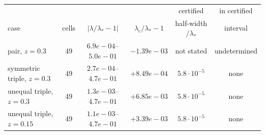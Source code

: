 \begin{tabular}{@{}lccccc@{}}
\toprule
 & & & & certified & in certified\\
 case & cells & $|\lambda/\lambda_*-1|$ & $\lambda_c/\lambda_*-1$ & half-width$/\lambda_*$ & interval\\
\midrule
pair, $z=0.3$ & 49 & $6.9e-04$--$5.0e-01$ & $-1.39e-03$ & not stated & undetermined\\
symmetric triple, $z=0.3$ & 49 & $2.7e-04$--$4.7e-01$ & $+8.49e-04$ & $5.8\cdot10^{-5}$ & none\\
unequal triple, $z=0.3$ & 49 & $1.3e-03$--$4.7e-01$ & $+6.85e-03$ & $5.8\cdot10^{-5}$ & none\\
unequal triple, $z=0.15$ & 49 & $1.1e-03$--$4.7e-01$ & $+3.39e-03$ & $5.8\cdot10^{-5}$ & none\\
\bottomrule
\end{tabular}
